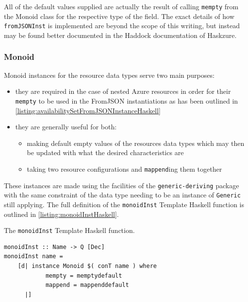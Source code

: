 \documentclass[11pt]{report}
\begin{document}
All of the default values supplied are actually the result of calling
\texttt{mempty} from the Monoid class for the respective type of the
field. The exact details of how \texttt{fromJSONInst} is implemented are beyond
the scope of this writing, but instead may be found better documented in the
Haddock documentation of Haskzure.

\subsubsection{Monoid}

Monoid instances for the resource data types serve two main purposes:

\begin{itemize}
    \item{} they are required in the case of nested Azure resources in order
        for their \texttt{mempty} to be used in the FromJSON instantiations as
        has been outlined in
        \autoref{listing:availabilitySetFromJSONInstanceHaskell}
    \item{} they are generally useful for both: \begin{itemize}
        \item{} making default empty values of the resources data types which
            may then be updated with what the desired characteristics are
        \item{} taking two resource configurations and \texttt{mappend}ing them
            together
    \end{itemize}
\end{itemize}

These instances are made using the facilities of the \texttt{generic-deriving}
\cite{packageGenericDeriving} package with the same constraint of the data type
needing to be an instance of \texttt{Generic} still applying. The full
definition of the \texttt{monoidInst} Template Haskell function is outlined
in \autoref{listing:monoidInstHaskell}.

\begin{listing}[H]
\caption{The \texttt{monoidInst} Template Haskell function.}
\label{listing:monoidInstHaskell}
\begin{verbatim}
monoidInst :: Name -> Q [Dec]
monoidInst name =
    [d| instance Monoid $( conT name ) where
            mempty = memptydefault
            mappend = mappenddefault
      |]
\end{verbatim}
\end{listing}
\end{document}
